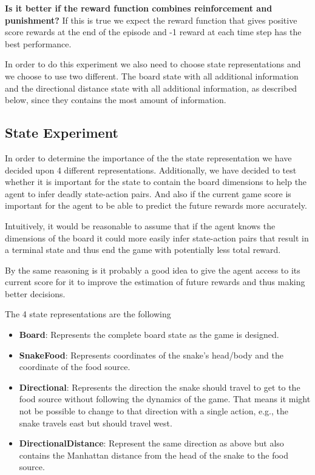 \documentclass[report.tex]{subfiles}
\begin{document}
    \textbf{Is it better if the reward function combines reinforcement and punishment?} If this is true we expect the reward function that gives positive score rewards at the end of the episode and -1 reward at each time step has the best performance.

    In order to do this experiment we also need to choose state representations and we choose to use two different. The board state with all additional information and the directional distance state with all additional information, as described below, since they contains the most amount of information.

    \subsection*{State Experiment}

    In order to determine the importance of the the state representation we have decided upon 4 different representations. Additionally, we have decided to test whether it is important for the state to contain the board dimensions to help the agent to infer deadly state-action pairs. And also if the current game score is important for the agent to be able to predict the future rewards more accurately.

    Intuitively, it would be reasonable to assume that if the agent knows the dimensions of the board it could more easily infer state-action pairs that result in a terminal state and thus end the game with potentially less total reward.

    By the same reasoning is it probably a good idea to give the agent access to its current score for it to improve the estimation of future rewards and thus making better decisions.

    The 4 state representations are the following

    \begin{itemize}
        \item \textbf{Board}: Represents the complete board state as the game is designed.
        \item \textbf{SnakeFood}: Represents coordinates of the snake's head/body and the coordinate of the food source.
        \item \textbf{Directional}: Represents the direction the snake should travel to get to the food source without following the dynamics of the game. That means it might not be possible to change to that direction with a single action, e.g., the snake travels east but should travel west.
        \item \textbf{DirectionalDistance}: Represent the same direction as above but also contains the Manhattan distance from the head of the snake to the food source.
    \end{itemize}
\end{document}
